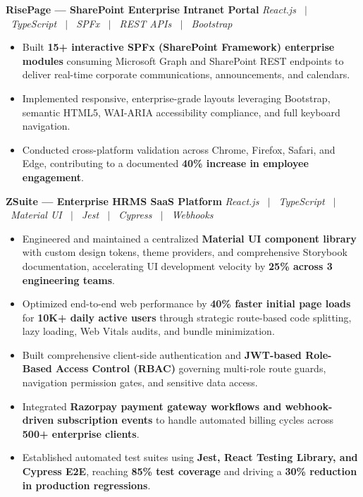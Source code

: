 \documentclass[letterpaper,10pt]{article}
\newcommand{\resumeProject}[2]{%
  \vspace{2pt}%
  \textbf{#1} \hfill \textit{#2}\\[-6pt]
}
\begin{document}
\vspace{0.2cm}
\resumeProject
  {RisePage --- SharePoint Enterprise Intranet Portal}{React.js \ $|$ \ TypeScript \ $|$ \ SPFx \ $|$ \ REST APIs \ $|$ \ Bootstrap}
\begin{itemize}
  \item Built \textbf{15+ interactive SPFx (SharePoint Framework) enterprise modules} consuming Microsoft Graph and SharePoint REST endpoints to deliver real-time corporate communications, announcements, and calendars.
  \item Implemented responsive, enterprise-grade layouts leveraging Bootstrap, semantic HTML5, WAI-ARIA accessibility compliance, and full keyboard navigation.
  \item Conducted cross-platform validation across Chrome, Firefox, Safari, and Edge, contributing to a documented \textbf{40\% increase in employee engagement}.
\end{itemize}
\vspace{0.2cm}
\resumeProject
  {ZSuite --- Enterprise HRMS SaaS Platform}{React.js \ $|$ \ TypeScript \ $|$ \ Material UI \ $|$ \ Jest \ $|$ \ Cypress \ $|$ \ Webhooks}
\begin{itemize}
  \item Engineered and maintained a centralized \textbf{Material UI component library} with custom design tokens, theme providers, and comprehensive Storybook documentation, accelerating UI development velocity by \textbf{25\% across 3 engineering teams}.
  \item Optimized end-to-end web performance by \textbf{40\% faster initial page loads} for \textbf{10K+ daily active users} through strategic route-based code splitting, lazy loading, Web Vitals audits, and bundle minimization.
  \item Built comprehensive client-side authentication and \textbf{JWT-based Role-Based Access Control (RBAC)} governing multi-role route guards, navigation permission gates, and sensitive data access.
  \item Integrated \textbf{Razorpay payment gateway workflows and webhook-driven subscription events} to handle automated billing cycles across \textbf{500+ enterprise clients}.
  \item Established automated test suites using \textbf{Jest, React Testing Library, and Cypress E2E}, reaching \textbf{85\% test coverage} and driving a \textbf{30\% reduction in production regressions}.
\end{itemize}
\end{document}
